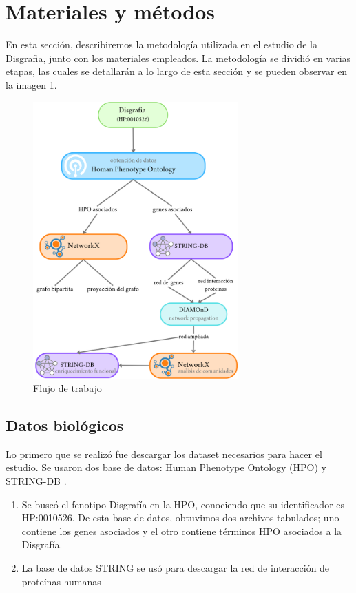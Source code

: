 \section{Materiales y métodos}

En esta sección, describiremos la metodología utilizada en el estudio de la Disgrafia,
junto con los materiales empleados. La metodología se dividió en varias etapas, las
cuales se detallarán a lo largo de esta sección y se pueden observar en la imagen \ref{fig:workflow}.

\begin{figure}[h!]
	\centering
	\includegraphics[width=0.7\textwidth]{figures/workflow.png}
	\caption{Flujo de trabajo}
	\label{fig:workflow}
\end{figure}

\subsection{Datos biológicos}

Lo primero que se realizó fue descargar los dataset necesarios para hacer el estudio. Se usaron dos base de datos: Human Phenotype Ontology (HPO) \cite{HPO2021} y STRING-DB \cite{String2021}.

\begin{enumerate}
	\item Se buscó el fenotipo Disgrafía en la HPO, conociendo que su identificador es HP:0010526. De esta base de datos, obtuvimos dos archivos tabulados; uno contiene los genes asociados y el otro contiene términos HPO asociados a la Disgrafía.
	\item La base de datos STRING se usó para descargar la red de interacción de proteínas humanas
\end{enumerate}


